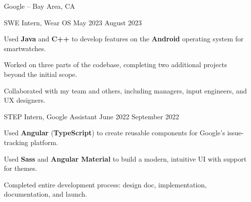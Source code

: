 \begin{entry}{Google -- Bay Area, CA}

	\entryItem
		{SWE Intern, Wear OS}
		{May 2023}
		{August 2023}
	
		\begin{items}
			\item Used \textbf{Java} and \textbf{C++} to develop features on the \textbf{Android} operating system for smartwatches.
			\item Worked on three parts of the codebase, completing two additional projects beyond the initial scope.
			\item Collaborated with my team and others, including managers, input engineers, and UX designers.
		\end{items}

	\entryItem
		{STEP Intern, Google Assistant}
		{June 2022}
		{September 2022}

		\begin{items}
			\item Used \textbf{Angular} (\textbf{TypeScript}) to create reusable components for Google's issue-tracking platform.
			\item Used \textbf{Sass} and \textbf{Angular Material} to build a modern, intuitive UI with support for themes.
			\item Completed entire development process: design doc, implementation, documentation, and launch.
		\end{items}

\end{entry}
